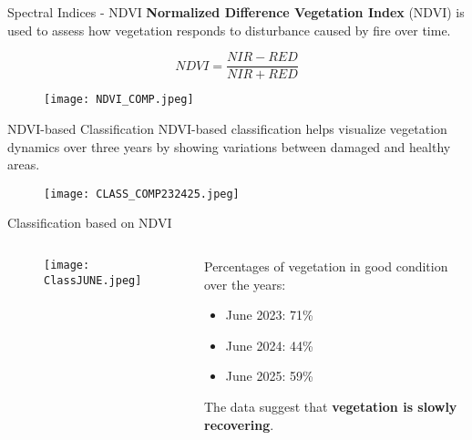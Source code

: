 \documentclass{beamer} %
\begin{document}
\begin{frame}{Spectral Indices - NDVI}
\textbf{Normalized Difference Vegetation Index} (NDVI) is used to assess how vegetation responds to disturbance caused by fire over time.

\centering 
    \begin{equation*}
        NDVI = \frac{NIR - RED}{NIR + RED}
    \end{equation*}
    \begin{figure}
            \texttt{[image: NDVI\_COMP.jpeg]}  
    \end{figure}
\end{frame}

\begin{frame}{NDVI-based Classification}
\bigskip
NDVI-based classification helps visualize vegetation dynamics over three years by showing variations between damaged and healthy areas. 
\begin{figure}
        \texttt{[image: CLASS\_COMP232425.jpeg]}  
    \end{figure}
\end{frame}

\begin{frame}{Classification based on NDVI}

\begin{columns}

\begin{column}{0.6\textwidth}

\begin{figure}
    \centering
            \texttt{[image: ClassJUNE.jpeg]}  
    \end{figure}
    \end{column}

\begin{column}{0.4\textwidth}
Percentages of vegetation in good condition over the years: \begin{itemize}
        \item June 2023: 71\%
        \item June 2024: 44\%
        \item June 2025: 59\%
    \end{itemize}
    \bigskip
The data suggest that \textbf{vegetation is slowly recovering}.
    \end{column}

\end{columns}
\end{frame}
\end{document}
